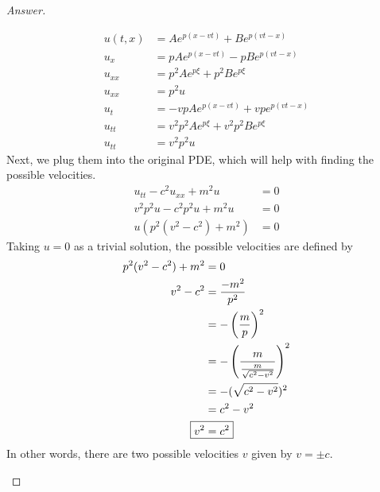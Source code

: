 \documentclass{article}
\theoremstyle{definition}
\renewcommand\qedsymbol{$\blacksquare$}
\newenvironment{ans}{\begin{proof}[Answer]\renewcommand{\qedsymbol}{}}{\end{proof}}
\begin{document}
\begin{ans}
\begin{enumerate}[start=38, resume*=answers]
    \begin{align*}
        u(t,x)&=Ae^{p(x-vt)}+Be^{p(vt-x)}\\
        u_x&=pAe^{p(x-vt)}-pBe^{p(vt-x)}\\
        u_{xx}&=p^2Ae^{p\xi}+p^2Be^{p\xi}\\
        u_{xx}&=p^2u\\
        u_t&=-vpAe^{p(x-vt)}+vpe^{p(vt-x)}\\
        u_{tt}&=v^2p^2Ae^{p\xi}+v^2p^2Be^{p\xi}\\
        u_{tt}&=v^2p^2u
    \end{align*}
    Next, we plug them into the original PDE, which will help with finding the possible velocities.
    \begin{align*}
        u_{tt}-c^2u_{xx}+m^2u&=0\\
        v^2p^2u - c^2p^2u + m^2u&=0\\
        u(p^2(v^2-c^2)+m^2)&=0
    \end{align*}
    Taking $u=0$ as a trivial solution, the possible velocities are defined by
    \begin{align*}
        p^2(v^2-c^2) + m^2 &= 0\\
        v^2-c^2&=\frac{-m^2}{p^2}\\
        &= -\left(\frac{m}{p}\right)^2\\
        &= -\left(\frac{m}{\frac{m}{\sqrt{c^2 - v^2}}}\right)^2\\
        &= - (\sqrt{c^2 - v^2})^2\\
        &= c^2 - v^2\\
        \Aboxed{v^2 &= c^2}
    \end{align*}
    In other words, there are two possible velocities $v$ given by $v = \pm c$.
    

\end{enumerate}
\end{ans}
\end{document}
